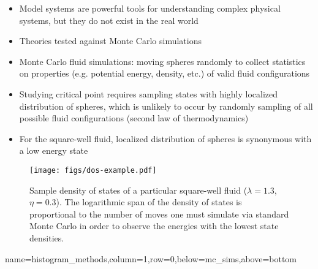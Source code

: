 \documentclass[paperwidth=48in,paperheight=36in,
fontscale=0.27,margin=0.75in]{baposter}
\begin{document}
\begin{poster}
{    %


    \begin{itemize}
    \item Model systems are powerful tools for understanding complex
      physical systems, but they do not exist in the real world
    \item Theories tested against Monte Carlo simulations
    \item Monte Carlo fluid simulations: moving spheres randomly to
      collect statistics on properties (e.g. potential energy, density,
      etc.) of valid fluid configurations
    \item Studying critical point requires sampling states with highly
      localized distribution of spheres, which is unlikely to occur by
      randomly sampling of all possible fluid configurations (second
      law of thermodynamics)
    \item For the square-well fluid, localized distribution of spheres
      is synonymous with a low energy state
    \end{itemize}

    \begin{figure}[H]
      \centering
      \texttt{[image: figs/dos-example.pdf]}
      \caption{Sample density of states of a particular square-well
        fluid ($\lambda=1.3$, $\eta=0.3$). The logarithmic span of the
        density of states is proportional to the number of moves one
        must simulate via standard Monte Carlo in order to observe the
        energies with the lowest state densities.}
      \label{fig:dos}
    \end{figure}

  }

  {name=histogram_methods,column=1,row=0,below=mc_sims,above=bottom} {%


}
\end{poster}
\end{document}
